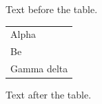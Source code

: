 \documentclass[12pt]{article}
\begin{document}
Text before the table.

\begin{tabular}{l}Alpha\\Be\\Gamma delta\end{tabular}

Text after the table.
\end{document}
